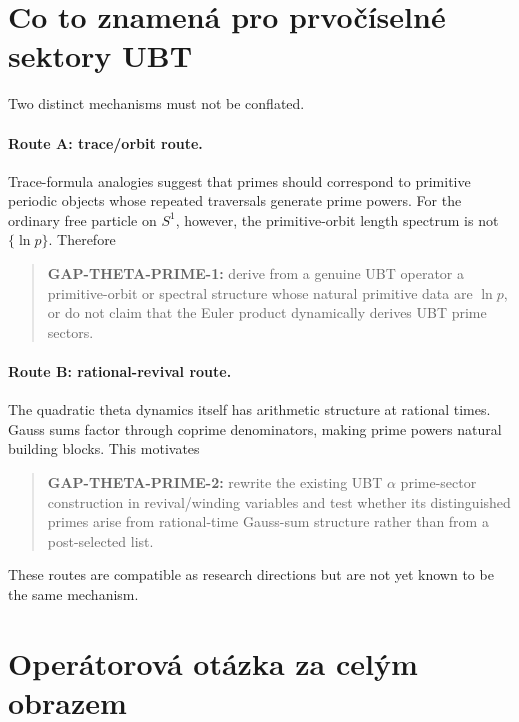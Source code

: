 \section{Co to znamená pro prvočíselné sektory UBT}

Two distinct mechanisms must not be conflated.

\paragraph{Route A: trace/orbit route.}
Trace-formula analogies suggest that primes should correspond to primitive periodic
objects whose repeated traversals generate prime powers.  For the ordinary free particle
on $S^1$, however, the primitive-orbit length spectrum is not $\{\ln p\}$.  Therefore
\begin{quote}
\textbf{GAP-THETA-PRIME-1:} derive from a genuine UBT operator a primitive-orbit or
spectral structure whose natural primitive data are $\ln p$, or do not claim that the
Euler product dynamically derives UBT prime sectors.
\end{quote}

\paragraph{Route B: rational-revival route.}
The quadratic theta dynamics itself has arithmetic structure at rational times.  Gauss
sums factor through coprime denominators, making prime powers natural building blocks.
This motivates
\begin{quote}
\textbf{GAP-THETA-PRIME-2:} rewrite the existing UBT $\alpha$ prime-sector construction
in revival/winding variables and test whether its distinguished primes arise from
rational-time Gauss-sum structure rather than from a post-selected list.
\end{quote}

These routes are compatible as research directions but are not yet known to be the same
mechanism.

\section{Operátorová otázka za celým obrazem}


